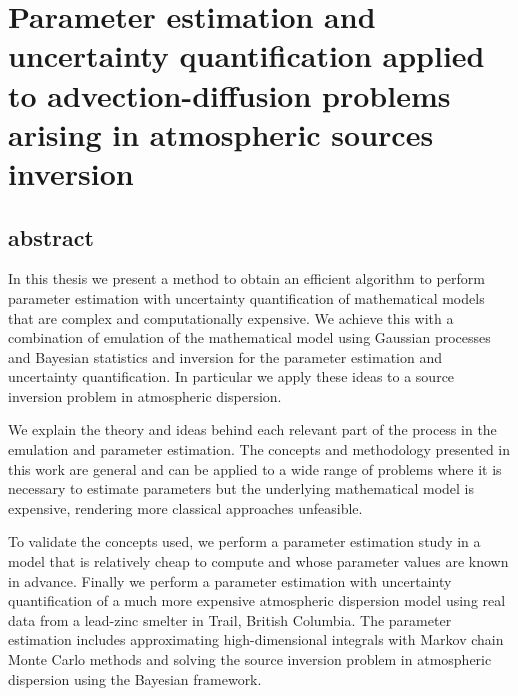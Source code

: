 \documentclass[12pt]{article}
\begin{document}
\section*{Parameter estimation and uncertainty quantification applied to
advection-diffusion problems arising in atmospheric sources inversion}


\subsection*{abstract}
In this thesis we present a method to obtain an efficient algorithm
to perform parameter estimation with uncertainty quantification 
of mathematical models that are complex and computationally
expensive. We achieve this with a combination of emulation of the mathematical
model using Gaussian processes  and Bayesian statistics and inversion for the parameter estimation
and uncertainty quantification.
In particular we apply these ideas to a source inversion problem in atmospheric dispersion.

We  explain the theory and ideas behind each relevant part 
of the process in the emulation and parameter estimation. The concepts and methodology presented 
in this work are general and can be applied
to a wide range of problems where it is necessary to estimate parameters  but the underlying
mathematical model is expensive, rendering  more classical approaches unfeasible.

To validate the concepts used, we perform a parameter estimation study
in a model that is relatively cheap to compute and whose parameter values are known in 
advance. Finally we perform a parameter estimation with
uncertainty quantification of a much more expensive atmospheric dispersion model
using real data from a lead-zinc smelter  in Trail, British Columbia. 
The parameter estimation includes  approximating high-dimensional integrals
with Markov chain Monte Carlo methods and solving the source inversion problem
in atmospheric dispersion using the Bayesian framework.
\end{document}
